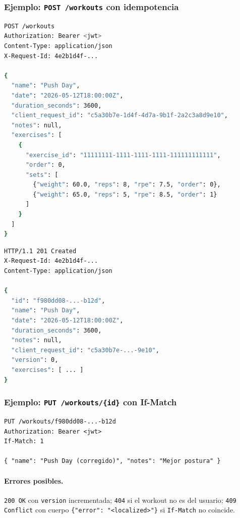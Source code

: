 \documentclass[11pt,a4paper]{article}
\begin{document}
\subsubsection{Ejemplo: \texttt{POST /workouts} con idempotencia}

\begin{lstlisting}[language=bash,caption={Request idempotente con \texttt{client\_request\_id}.}]
POST /workouts
Authorization: Bearer <jwt>
Content-Type: application/json
X-Request-Id: 4e2b1d4f-...

{
  "name": "Push Day",
  "date": "2026-05-12T18:00:00Z",
  "duration_seconds": 3600,
  "client_request_id": "c5a30b7e-1d4f-4d7a-9b1f-2a2c3a8d9e10",
  "notes": null,
  "exercises": [
    {
      "exercise_id": "11111111-1111-1111-1111-111111111111",
      "order": 0,
      "sets": [
        {"weight": 60.0, "reps": 8, "rpe": 7.5, "order": 0},
        {"weight": 65.0, "reps": 5, "rpe": 8.5, "order": 1}
      ]
    }
  ]
}
\end{lstlisting}

\begin{lstlisting}[language=bash,caption={Respuesta 201 (primera vez) o 200 (retransmisión con la misma clave).}]
HTTP/1.1 201 Created
X-Request-Id: 4e2b1d4f-...
Content-Type: application/json

{
  "id": "f980dd08-...-b12d",
  "name": "Push Day",
  "date": "2026-05-12T18:00:00Z",
  "duration_seconds": 3600,
  "notes": null,
  "client_request_id": "c5a30b7e-...-9e10",
  "version": 0,
  "exercises": [ ... ]
}
\end{lstlisting}

\subsubsection{Ejemplo: \texttt{PUT /workouts/\{id\}} con If-Match}

\begin{lstlisting}[caption={Update condicional. El servidor compara \texttt{If-Match} con la \texttt{version} actual.}]
PUT /workouts/f980dd08-...-b12d
Authorization: Bearer <jwt>
If-Match: 1

{ "name": "Push Day (corregido)", "notes": "Mejor postura" }
\end{lstlisting}

\paragraph{Errores posibles.}
\texttt{200 OK} con \texttt{version} incrementada;
\texttt{404} si el workout no es del usuario;
\texttt{409 Conflict} con cuerpo \verb|{"error": "<localized>"}| si \texttt{If-Match} no coincide.
\end{document}
